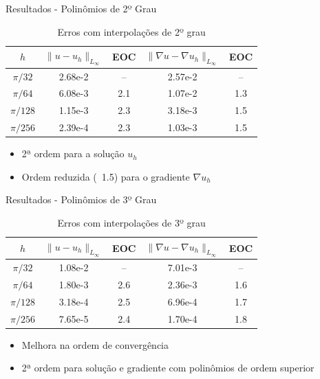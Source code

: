 \documentclass[../main/main.tex]{subfiles}
\begin{document}
\begin{frame}{Resultados - Polinômios de 2º Grau}
\begin{table}
\centering
\caption{Erros com interpolações de 2º grau}
\begin{tabular}{ccccc}
\toprule
$h$ & $\|u-u_h\|_{L_\infty}$ & EOC & $\|\nabla u-\nabla u_h\|_{L_\infty}$ & EOC \\
\midrule
$\pi/32$ & 2.68e-2 & -- & 2.57e-2 & -- \\
$\pi/64$ & 6.08e-3 & 2.1 & 1.07e-2 & 1.3 \\
$\pi/128$ & 1.15e-3 & 2.3 & 3.18e-3 & 1.5 \\
$\pi/256$ & 2.39e-4 & 2.3 & 1.03e-3 & 1.5 \\
\bottomrule
\end{tabular}
\end{table}

\begin{itemize}
\item 2ª ordem para a solução $u_h$
\item Ordem reduzida (~1.5) para o gradiente $\nabla u_h$
\end{itemize}
\end{frame}

\begin{frame}{Resultados - Polinômios de 3º Grau}
\begin{table}
\centering
\caption{Erros com interpolações de 3º grau}
\begin{tabular}{ccccc}
\toprule
$h$ & $\|u-u_h\|_{L_\infty}$ & EOC & $\|\nabla u-\nabla u_h\|_{L_\infty}$ & EOC \\
\midrule
$\pi/32$ & 1.08e-2 & -- & 7.01e-3 & -- \\
$\pi/64$ & 1.80e-3 & 2.6 & 2.36e-3 & 1.6 \\
$\pi/128$ & 3.18e-4 & 2.5 & 6.96e-4 & 1.7 \\
$\pi/256$ & 7.65e-5 & 2.4 & 1.70e-4 & 1.8 \\
\bottomrule
\end{tabular}
\end{table}

\begin{itemize}
\item Melhora na ordem de convergência
\item 2ª ordem para solução e gradiente com polinômios de ordem superior
\end{itemize}
\end{frame}
\end{document}
